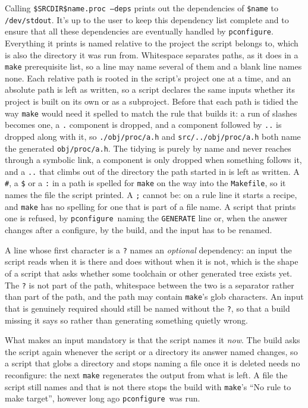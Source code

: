 \documentclass{article}
\newcommand{\pconfigure}{\texttt{pconfigure}}
\begin{document}
Calling \texttt{\$SRCDIR\$name.proc --deps} prints out the
dependencies of \texttt{\$name} to \texttt{/dev/stdout}.  It's up to
the user to keep this dependency list complete and to ensure that all
these dependencies are eventually handled by \pconfigure.  Everything
it prints is named relative to the project the script belongs to,
which is also the directory it was run from.
Whitespace separates paths, as it does in a \texttt{make} prerequisite
list, so a line may name several of them and a blank line names none.
Each relative path is rooted in the script's project one at a time,
and an absolute path is left as written, so a script declares the same
inputs whether its project is built on its own or as a subproject.
Before that each path is tidied the way \texttt{make} would need it
spelled to match the rule that builds it: a run of slashes becomes one,
a \texttt{.} component is dropped, and a component followed by
\texttt{..} is dropped along with it, so \texttt{./obj/proc/a.h} and
\texttt{src/../obj/proc/a.h} both name the generated
\texttt{obj/proc/a.h}.  The tidying is purely by name and never
reaches through a symbolic link, a component is only dropped when
something follows it, and a \texttt{..} that climbs out of the
directory the path started in is left as written.
A \texttt{\#}, a \texttt{\$} or a \texttt{:} in a path is spelled
for \texttt{make} on the way into the \texttt{Makefile}, so it names
the file the script printed.  A \texttt{;} cannot be: on a rule line
it starts a recipe, and \texttt{make} has no spelling for one that is
part of a file name.  A script that prints one is refused, by
\pconfigure\ naming the \texttt{GENERATE} line or, when the answer
changes after a configure, by the build, and the input has to be
renamed.

A line whose first character is a \texttt{?} names an \emph{optional}
dependency: an input the script reads when it is there and does without
when it is not, which is the shape of a script that asks whether some
toolchain or other generated tree exists yet.  The \texttt{?} is not
part of the path, whitespace between the two is a separator rather than
part of the path, and the path may contain \texttt{make}'s glob
characters.  An input that is genuinely required should still be named
without the \texttt{?}, so that a build missing it says so rather than
generating something quietly wrong.

What makes an input mandatory is that the script names it \emph{now}.
The build asks the script again whenever the script or a directory its
answer named changes, so a script that globs a directory and stops
naming a file once it is deleted needs no reconfigure: the next
\texttt{make} regenerates the output from what is left.  A file the
script still names and that is not there stops the build with
\texttt{make}'s ``No rule to make target'', however long ago
\pconfigure\ was run.
\end{document}
